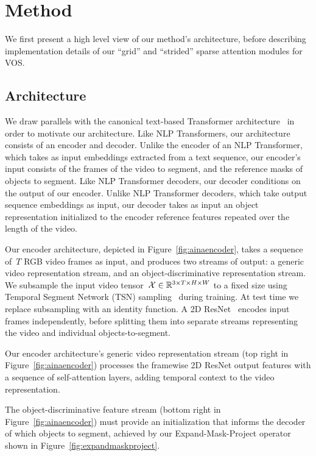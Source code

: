 \section{Method}

We first present a high level view of our method's architecture, before
describing implementation details of our ``grid'' and ``strided'' sparse
attention modules for VOS\@.


\subsection{Architecture}
\label{sec:architecture}

We draw parallels with the canonical text-based Transformer
architecture~\citep{vaswani2017attention} in order to motivate our architecture.
Like NLP Transformers, our architecture consists of an encoder and decoder.
Unlike the encoder of an NLP Transformer, which takes as input embeddings
extracted from a text sequence, our encoder's input consists of the frames of
the video to segment, and the reference masks of objects to segment.
Like NLP Transformer decoders, our decoder conditions on the output of our
encoder.
Unlike NLP Transformer decoders, which take output sequence embeddings as
input, our decoder takes as input an object representation initialized to the
encoder reference features repeated over the length of the video.

Our encoder architecture, depicted in Figure~\ref{fig:ainaencoder}, takes a
sequence of~$T$ RGB video frames as input, and produces two streams of output:
a generic video representation stream, and an object-discriminative
representation stream.
We subsample the input video
tensor~$\mathcal{X}{} \in \mathbb{R}{}^{3\times T \times H\times W}$ to a fixed size
using Temporal Segment Network (TSN) sampling~\citep{wang2016temporal} during
training.
At test time we replace subsampling with an identity function.
A 2D ResNet~\citep{he2016deep} encodes input frames independently, before
splitting them into separate streams representing the video and individual
objects-to-segment.

Our encoder architecture's generic video representation stream (top right in
Figure~\ref{fig:ainaencoder}) processes the framewise 2D ResNet output features
with a sequence of self-attention layers, adding temporal context to the video
representation.

The object-discriminative feature stream (bottom right in
Figure~\ref{fig:ainaencoder}) must provide an initialization that informs the
decoder of which objects to segment, achieved by our Expand-Mask-Project
operator shown in Figure~\ref{fig:expandmaskproject}.

